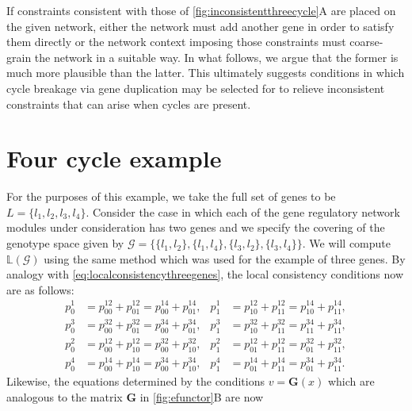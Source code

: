 If constraints consistent with those of \ref{fig:inconsistentthreecycle}A are placed on the given network, either the network must add another gene in order to satisfy them directly or the network context imposing those constraints must coarse-grain the network in a suitable way. In what follows, we argue that the former is much more plausible than the latter. This ultimately suggests conditions in which cycle breakage via gene duplication may be selected for to relieve inconsistent constraints that can arise when cycles are present.


\section{Four cycle example}

For the purposes of this example, we take the full set of genes to be $L = \{ l_1,l_2,l_3,l_4 \}$. Consider the case in which each of the gene regulatory network modules under consideration has two genes and we specify the covering of the genotype space given by $\mathcal{G} = \{\{l_1,l_2 \},\{l_1,l_4 \},\{l_3,l_2\},\{l_3,l_4\} \}$.  We will compute $\mathbb{L}(\mathcal{G})$ using the same method which was used for the example of three genes.  By analogy with \ref{eq:localconsistencythreegenes}, the local consistency conditions now are as follows:
\begin{equation}
\begin{aligned}\label{eq:pparsys}
p^1_0 &= p^{12}_{00} + p^{12}_{01} = p^{14}_{00} + p^{14}_{01}, &
p^1_1 &= p^{12}_{10} + p^{12}_{11} = p^{14}_{10} + p^{14}_{11},\\
p^3_0 &= p^{32}_{00} + p^{32}_{01} = p^{34}_{00} + p^{34}_{01},&
p^3_1 &= p^{32}_{10} + p^{32}_{11} = p^{34}_{11} + p^{34}_{11},\\
p^2_0 &= p^{12}_{00} + p^{12}_{10} = p^{32}_{00} + p^{32}_{10},&
p^2_1 &= p^{12}_{01} + p^{12}_{11} = p^{32}_{01} + p^{32}_{11},\\
p^4_0 &= p^{14}_{00} + p^{14}_{10} = p^{34}_{00} + p^{34}_{10},&
p^4_1 &= p^{14}_{01} + p^{14}_{11} = p^{34}_{01} + p^{34}_{11}.
\end{aligned}
\end{equation}
Likewise, the equations determined by the conditions $v = \mathbf{G}(x)$ which are analogous to the matrix $\mathbf{G}$ in \ref{fig:efunctor}B are now
